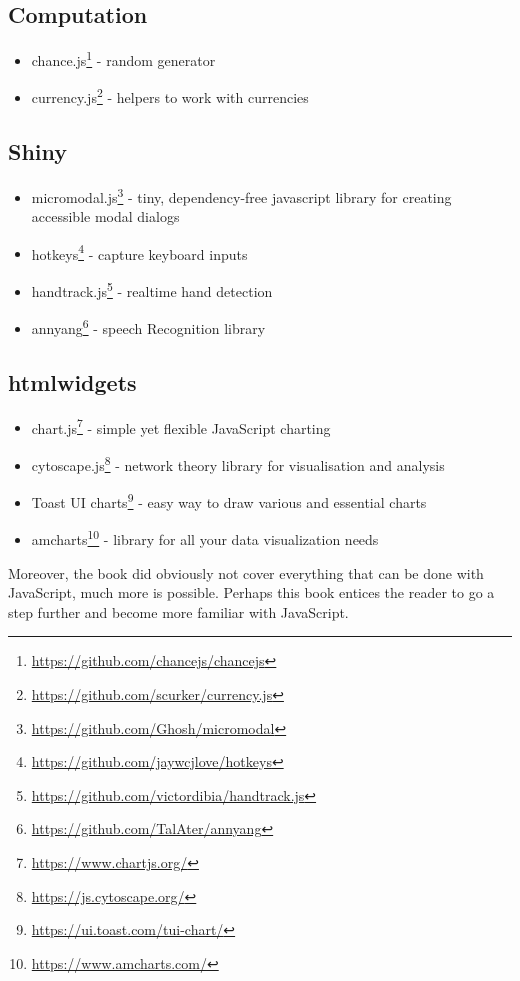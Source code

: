 \documentclass[
]{krantz}
\providecommand{\tightlist}{%
  \setlength{\itemsep}{0pt}\setlength{\parskip}{0pt}}
\renewcommand{\href}[2]{#2\footnote{\url{#1}}}
\begin{document}
\hypertarget{computation}{%
\subsection{Computation}\label{computation}}

\begin{itemize}
\tightlist
\item
  \href{https://github.com/chancejs/chancejs}{chance.js} - random generator
\item
  \href{https://github.com/scurker/currency.js}{currency.js} - helpers to work with currencies
\end{itemize}

\hypertarget{shiny}{%
\subsection{Shiny}\label{shiny}}

\begin{itemize}
\tightlist
\item
  \href{https://github.com/Ghosh/micromodal}{micromodal.js} - tiny, dependency-free javascript library for creating accessible modal dialogs
\item
  \href{https://github.com/jaywcjlove/hotkeys}{hotkeys} - capture keyboard inputs
\item
  \href{https://github.com/victordibia/handtrack.js}{handtrack.js} - realtime hand detection
\item
  \href{https://github.com/TalAter/annyang}{annyang} - speech Recognition library
\end{itemize}

\hypertarget{htmlwidgets}{%
\subsection{htmlwidgets}\label{htmlwidgets}}

\begin{itemize}
\tightlist
\item
  \href{https://www.chartjs.org/}{chart.js} - simple yet flexible JavaScript charting
\item
  \href{https://js.cytoscape.org/}{cytoscape.js} - network theory library for visualisation and analysis
\item
  \href{https://ui.toast.com/tui-chart/}{Toast UI charts} - easy way to draw various and essential charts
\item
  \href{https://www.amcharts.com/}{amcharts} - library for all your data visualization needs
\end{itemize}

Moreover, the book did obviously not cover everything that can be done with JavaScript, much more is possible. Perhaps this book entices the reader to go a step further and become more familiar with JavaScript.

  

\backmatter
\printindex
\end{document}
